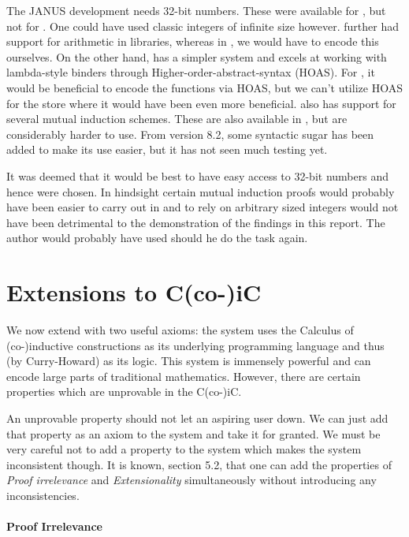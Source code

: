 The JANUS development needs 32-bit numbers. These were available for
\coq{}, but not for \twelf{}. One could have used classic integers of
infinite size however. \coq{} further had support for arithmetic in
libraries, whereas in \twelf{}, we would have to encode this
ourselves. On the other hand, \twelf{} has a simpler system and excels
at working with lambda-style binders through
Higher-order-abstract-syntax (HOAS). For \twelf{}, it would be
beneficial to encode the functions via HOAS, but we can't utilize HOAS
for the store where it would have been even more beneficial. \twelf{}
also has support for several mutual induction schemes. These are also
available in \coq{}, but are considerably harder to use. From \coq{}
version 8.2, some syntactic sugar has been added to make its
use easier, but it has not seen much testing yet.

It was deemed that it would be best to have easy access to 32-bit
numbers and hence \coq{} were chosen. In hindsight certain mutual
induction proofs would probably have been easier to carry out in
\twelf{} and to rely on arbitrary sized integers would not have been
detrimental to the demonstration of the findings in this report. The
author would probably have used \twelf{} should he do the task again.

\section{Extensions to C(co-)iC}

We now extend \coq{} with two useful axioms: the \coq{} system uses
the Calculus of (co-)inductive constructions as its underlying
programming language and thus (by Curry-Howard) as its logic. This
system is immensely powerful and can encode large parts of traditional
mathematics. However, there are certain properties which are
unprovable in the C(co-)iC.

An unprovable property should not let an aspiring \coq{} user down. We
can just add that property as an axiom to the system and take it for
granted. We must be very careful not to add a property to the system
which makes the system inconsistent though. It is known,
\cite{coq-add} section 5.2, that one can add the properties of \emph{Proof
  irrelevance} and \emph{Extensionality} simultaneously without
introducing any inconsistencies.

\paragraph{Proof Irrelevance}
\label{sec:proof-irrelevance}

